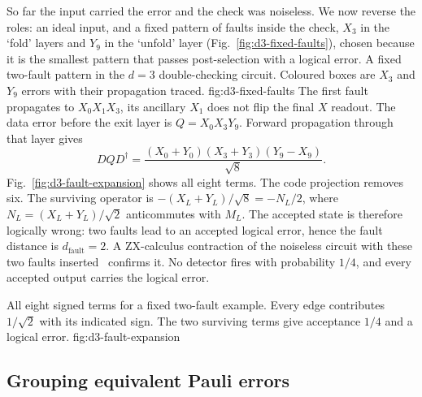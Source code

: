 So far the input carried the error and the check was noiseless. We now reverse the roles: an ideal input, and a fixed pattern of faults inside the check, $X_3$ in the `fold' layers and $Y_9$ in the `unfold' layer (Fig.~\ref{fig:d3-fixed-faults}), chosen because it is the smallest pattern that passes post-selection with a logical error.
{A fixed two-fault pattern in the $d=3$ double-checking circuit.
Coloured boxes are $X_3$ and $Y_9$ errors with their propagation traced.}
{fig:d3-fixed-faults}
The first fault propagates to $X_0X_1X_3$, its ancillary $X_1$ does not
flip the final $X$ readout. The data error before the exit layer is
$Q=X_0X_3Y_9$. Forward propagation through that layer gives
\begin{equation}
 DQD^\dagger=\frac{(X_0+Y_0)(X_3+Y_3)(Y_9-X_9)}{\sqrt8}.
 \label{eq:v2-fixed-fault}
\end{equation}
Fig.~\ref{fig:d3-fault-expansion} shows all eight terms.
The code projection removes six. The surviving operator is
$-(X_L+Y_L)/\sqrt8=-N_L/2$, where
$N_L=(X_L+Y_L)/\sqrt2$ anticommutes with $M_L$.
The accepted state is therefore logically wrong: two faults lead to an accepted logical error, hence the fault distance is $d_\text{fault}=2$. 
A ZX-calculus contraction of the noiseless circuit with these two faults inserted~\cite{wan} confirms it. No detector fires with probability $1/4$, and every accepted output carries the logical error.

{All eight signed terms for a fixed two-fault example.
Every edge contributes $1/\sqrt2$ with its indicated sign. The two surviving terms give acceptance $1/4$ and a logical error.}
{fig:d3-fault-expansion}


\subsection{Grouping equivalent Pauli errors}\label{sec:grouping}



